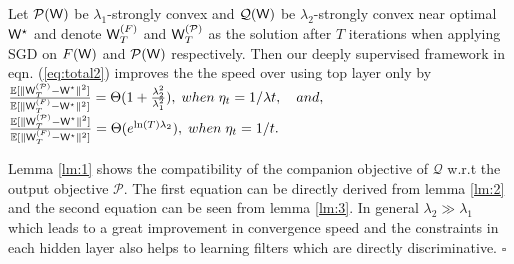 \documentclass{article} %
\newcommand{\cW}{{\bf \mathsf{W}}}
\newcommand{\cE}{{\mathbb{E}}}
\newcommand{\aP}{{\mathcal{P}}}
\newcommand{\aQ}{{\mathcal{Q}}}
\newcommand{\cWs}{{\bf \mathsf{W}}^{\star}}
\newenvironment{proof}[1][Proof]{\begin{trivlist}
\item[\hskip \labelsep {\bfseries #1}]}{\end{trivlist}}
\begin{document}
{\theor Let $\aP(\cW)$ be $\lambda_1$-strongly convex and $\aQ(\cW)$ be $\lambda_2$-strongly convex near optimal $\cWs$ and denote $\cW_T^{(F)}$ and $\cW_T^{(\aP)}$ as the solution after $T$ iterations when applying SGD on $F(\cW)$ and $\aP(\cW)$ respectively. Then our deeply supervised framework in eqn. (\ref{eq:total2}) improves the the speed over using top layer only by
$\frac{\cE[\lVert \cW_T^{(\aP)}- \cWs \rVert^2]}{\cE[\lVert \cW_T^{(F)} - \cWs \rVert^2]} = \Theta (1+\frac{\lambda_2^2}{\lambda_1^2}), \; when \; \eta_t=1/\lambda t, \quad and,$
$\frac{\cE[\lVert \cW_T^{(\aP)}- \cWs \rVert^2]}{\cE[\lVert \cW_T^{(F)} - \cWs \rVert^2]} = \Theta (e^{\ln(T) \lambda_2}), \; when \; \eta_t=1/t.$
}
\begin{proof}

Lemma \ref{lm:1} shows the compatibility of the companion objective of $\aQ$ w.r.t the output objective $\aP$. The first equation can be directly derived from lemma \ref{lm:2} and the second equation can be seen from lemma \ref{lm:3}. In general $\lambda_2 \gg \lambda_1$ which leads to a great improvement in convergence speed and the constraints in each hidden layer also helps to learning filters which are directly discriminative.
\hfill $\square$
\end{proof}


\vspace{-1mm}
\end{document}
